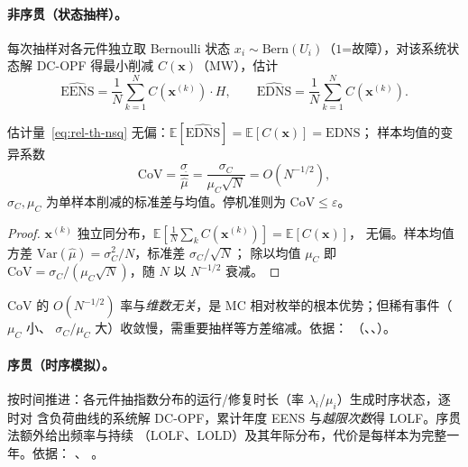 \paragraph{非序贯（状态抽样）。}
每次抽样对各元件独立取 Bernoulli 状态 $x_i\sim\mathrm{Bern}(U_i)$（$1$=故障），对该系统状态解
DC-OPF 得最小削减 $C(\mathbf x)$（MW），估计
\begin{equation}
 \widehat{\mathrm{EENS}}=\frac1N\sum_{k=1}^N C(\mathbf x^{(k)})\cdot H,\qquad
 \widehat{\mathrm{EDNS}}=\frac1N\sum_{k=1}^N C(\mathbf x^{(k)}).
 \label{eq:rel-th-nsq}
\end{equation}

\begin{theorem}\label{thm:rel-th-cov}
估计量~\eqref{eq:rel-th-nsq} 无偏：$\mathbb E[\widehat{\mathrm{EDNS}}]=\mathbb E[C(\mathbf x)]=\mathrm{EDNS}$；
样本均值的变异系数
\begin{equation}
 \mathrm{CoV}=\frac{\sigma_{\widehat{}}}{\widehat\mu}=\frac{\sigma_C}{\mu_C\sqrt N}=O\!\left(N^{-1/2}\right),
 \label{eq:rel-th-cov}
\end{equation}
$\sigma_C,\mu_C$ 为单样本削减的标准差与均值。停机准则为 $\mathrm{CoV}\le\varepsilon$。
\end{theorem}

\begin{proof}
$\mathbf x^{(k)}$ 独立同分布，$\mathbb E[\tfrac1N\sum_kC(\mathbf x^{(k)})]=\mathbb E[C(\mathbf x)]$，
无偏。样本均值方差 $\mathrm{Var}(\widehat\mu)=\sigma_C^2/N$，标准差 $\sigma_C/\sqrt N$；
除以均值 $\mu_C$ 即 $\mathrm{CoV}=\sigma_C/(\mu_C\sqrt N)$，随 $N$ 以 $N^{-1/2}$ 衰减。
\end{proof}

CoV 的 $O(N^{-1/2})$ 率与\emph{维数无关}，是 MC 相对枚举的根本优势；但稀有事件（$\mu_C$ 小、
$\sigma_C/\mu_C$ 大）收敛慢，需重要抽样等方差缩减。依据：
（、、）。

\paragraph{序贯（时序模拟）。}
按时间推进：各元件抽指数分布的运行/修复时长（率 $\lambda_i$/$\mu_i$）生成时序状态，逐时对
含负荷曲线的系统解 DC-OPF，累计年度 EENS 与\emph{越限次数}得 LOLF。序贯法额外给出频率与持续
（LOLF、LOLD）及其年际分布，代价是每样本为完整一年。依据：
、
。

